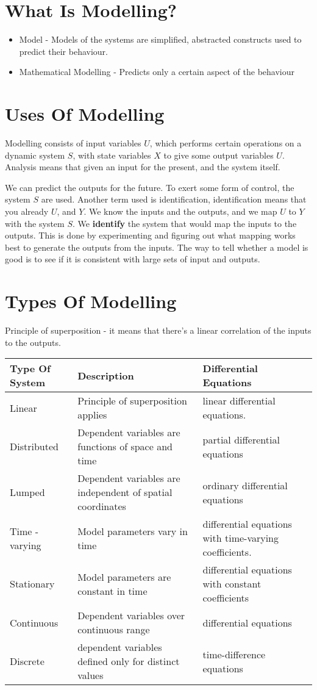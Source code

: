 \documentclass[11pt]{report}
\begin{document}
\section{What Is Modelling?}
\label{sec:orgab03cc3}
\begin{itemize}
\item Model - Models of the systems are simplified, abstracted constructs used to predict their behaviour.
\item Mathematical Modelling - Predicts only a certain aspect of the behaviour
\end{itemize}
\section{Uses Of Modelling}
\label{sec:org4f18332}
Modelling consists of input variables \(U\), which performs certain operations on a dynamic system \(S\), with state variables \(X\) to give some output variables \(U\).
Analysis means that given an input for the present, and the system itself.

We can predict the outputs for the future. To exert some form of control, the system \(S\) are used. Another term used is identification, identification means that you already \(U\), and \(Y\). We know the inputs and the outputs, and we map \(U\) to \(Y\) with the system \(S\). We \textbf{identify} the system that would map the inputs to the outputs. This is done by experimenting and figuring out what mapping works best to generate the outputs from the inputs. The way to tell whether a model is good is to see if it is consistent with large sets of input and outputs.
\section{Types Of Modelling}
\label{sec:org00a4b0e}
Principle of superposition - it means that there's a linear correlation of the inputs to the outputs.
\begin{center}
\begin{tabular}{lll}
\hline
Type Of System & Description & Differential Equations\\
\hline
Linear & Principle of superposition applies & linear differential equations.\\
Distributed & Dependent variables are functions of space and time & partial differential equations\\
Lumped & Dependent variables are independent of spatial coordinates & ordinary differential equations\\
Time - varying & Model parameters vary in time & differential equations with time-varying coefficients.\\
Stationary & Model parameters are constant in time & differential equations with constant coefficients\\
Continuous & Dependent variables over continuous range & differential equations\\
Discrete & dependent variables defined only for distinct values & time-difference equations\\
\hline
\end{tabular}
\end{center}
\end{document}

